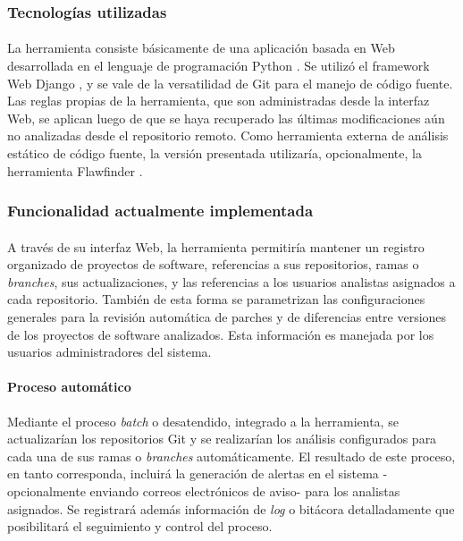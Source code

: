\documentclass[11pt,a4paper]{article}
\begin{document}
\subsubsection{Tecnologías utilizadas}

\paragraph{}La herramienta consiste básicamente de una aplicación basada en Web desarrollada en el lenguaje de programación Python \cite{Python}. Se utilizó el framework Web Django \cite{Django}, y se vale de la versatilidad de Git \cite{Git} para el manejo de código fuente.  Las reglas propias de la herramienta, que son administradas desde la interfaz Web, se aplican luego de que se haya recuperado las últimas modificaciones aún no analizadas desde el repositorio remoto. Como herramienta externa de análisis estático de código fuente, la versión presentada utilizaría, opcionalmente, la herramienta Flawfinder \cite{Flawfinder}.
\\

\subsubsection{Funcionalidad actualmente implementada}

\paragraph{}A través de su interfaz Web, la herramienta permitiría mantener un registro organizado de proyectos de software, referencias a sus repositorios, ramas o \textit{branches}, sus actualizaciones, y las referencias a los usuarios analistas asignados a cada repositorio. También de esta forma se parametrizan las configuraciones generales para la revisión automática de parches y de diferencias entre versiones de los proyectos de software analizados. Esta información es manejada por los usuarios administradores del sistema.
\\

\paragraph{Proceso automático} Mediante el proceso \textit{batch} o desatendido, integrado a la herramienta, se actualizarían los repositorios Git \cite{Git} y se realizarían los análisis configurados para cada una de sus ramas o \textit{branches} automáticamente. El resultado de este proceso, en tanto corresponda, incluirá la generación de alertas en el sistema -opcionalmente enviando correos electrónicos de aviso- para los analistas asignados. Se registrará además información de \textit{log} o bitácora detalladamente que posibilitará el seguimiento y control del proceso.
\\
\end{document}
